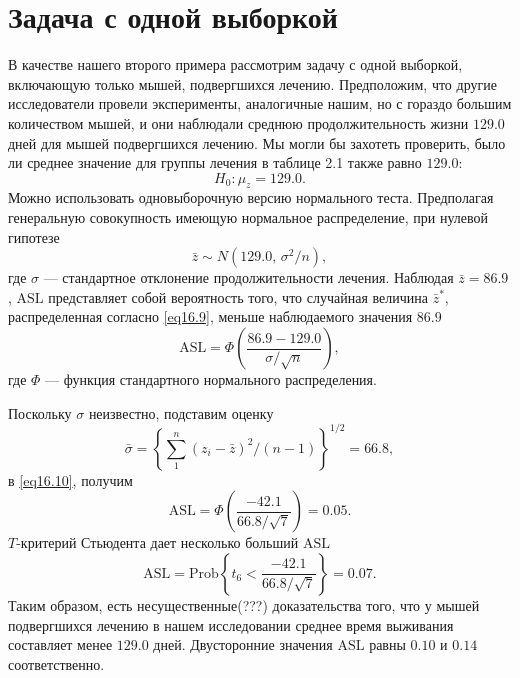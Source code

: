 \section{Задача с одной выборкой}

В качестве нашего второго примера рассмотрим задачу с одной выборкой, включающую только мышей, подвергшихся лечению. Предположим, что другие исследователи провели эксперименты, аналогичные нашим, но с гораздо большим количеством мышей, и они наблюдали среднюю продолжительность жизни $129.0$ дней для мышей подвергшихся лечению. Мы могли бы захотеть проверить, было ли среднее значение для группы лечения в таблице 2.1 также  равно $129.0$:
\begin{equation}\label{eq16.8}
    H_0: \mu_z = 129.0.
\end{equation}
Можно использовать одновыборочную версию нормального теста. Предполагая генеральную совокупность имеющую нормальное распределение, при нулевой гипотезе
\begin{equation}\label{eq16.9}
    \bar{z} \sim N(129.0,\,\sigma^{2}/n),
\end{equation}
где $\sigma$ --- стандартное отклонение продолжительности лечения. Наблюдая $\bar{z} = 86.9$, $\text{ASL}$ представляет собой вероятность того, что случайная величина $\bar{z}^{*}$, распределенная согласно \ref{eq16.9}, меньше наблюдаемого значения $86.9$
\begin{equation}\label{eq16.10}
    \text{ASL} = \Phi\left(\frac{86.9-129.0}{\sigma/\sqrt{n}}\right),
\end{equation}
где $\Phi$ --- функция стандартного нормального распределения.

Поскольку $\sigma$ неизвестно, подставим оценку
\begin{equation}\label{eq16.11}
    \bar{\sigma} = \left\{\sum\limits_{1}^{n}(z_i-\bar{z})^2/(n-1)\right\}^{1/2} = 66.8,
\end{equation}
в \ref{eq16.10}, получим
\begin{equation}\label{eq16.12}
    \text{ASL} = \Phi\left(\frac{-42.1}{66.8/\sqrt{7}}\right) = 0.05.
\end{equation}
$T$-критерий Стьюдента дает несколько больший $\text{ASL}$
\begin{equation}\label{eq16.13}
    \text{ASL} = \text{Prob}\left\{t_6 < \frac{-42.1}{66.8/\sqrt{7}}\right\} = 0.07.
\end{equation}
Таким образом, есть несущественные(???) доказательства того, что у мышей подвергшихся лечению в нашем исследовании среднее время выживания составляет менее $129.0$ дней. Двусторонние значения $\text{ASL}$ равны $0.10$ и $0.14$ соответственно.

